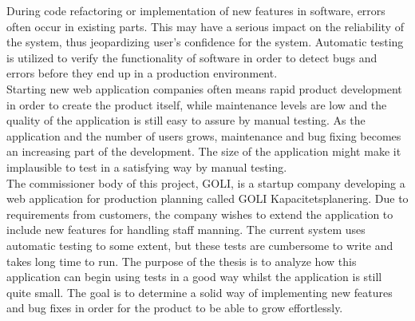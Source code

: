 During code refactoring or implementation of new features in software,
errors often occur in existing parts. This may have a serious impact on
the reliability of the system, thus jeopardizing user's confidence for
the system. Automatic testing is utilized to verify the functionality of
software in order to detect bugs and errors before they end up in a
production environment.\\

Starting new web application companies often means rapid product
development in order to create the product itself, while maintenance
levels are low and the quality of the application is still easy to
assure by manual testing. As the application and the number of users
grows, maintenance and bug fixing becomes an increasing part of the
development. The size of the application might make it implausible to
test in a satisfying way by manual testing.\\

The commissioner body of this project, GOLI, is a startup company
developing a web application for production planning called GOLI
Kapacitetsplanering. Due to requirements from customers, the company
wishes to extend the application to include new features for handling
staff manning. The current system uses automatic testing to some extent,
but these tests are cumbersome to write and takes long time to run. The
purpose of the thesis is to analyze how this application can begin using
tests in a good way whilst the application is still quite small. The
goal is to determine a solid way of implementing new features and bug
fixes in order for the product to be able to grow effortlessly.\\
